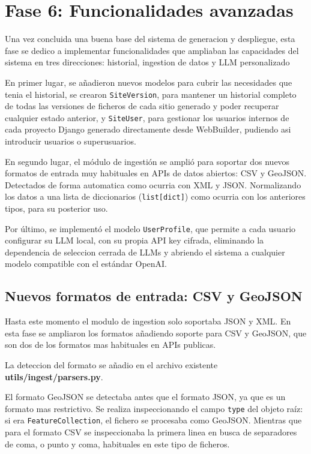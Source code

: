 \section{Fase 6: Funcionalidades avanzadas}
\label{sec:funcionalidades-avanzadas}

Una vez concluida una buena base del sistema de generacion y despliegue, esta fase se dedico a implementar funcionalidades que ampliaban las capacidades del sistema en tres direcciones: historial, ingestion de datos y LLM personalizado

En primer lugar, se añadieron nuevos modelos para cubrir las necesidades que tenia el historial, se crearon \texttt{SiteVersion}, para mantener 
un historial completo de todas las versiones de ficheros de cada sitio generado y poder recuperar cualquier estado anterior, y \texttt{SiteUser}, 
para gestionar los usuarios internos de cada proyecto Django generado directamente desde WebBuilder, pudiendo asi introducir usuarios o superusuarios.

En segundo lugar, el módulo de ingestión se amplió para soportar dos nuevos formatos de entrada muy habituales en APIs de datos abiertos: CSV y GeoJSON. Detectados de forma automatica como ocurria con XML y JSON. Normalizando los datos a una lista de diccionarios (\texttt{list[dict]}) como ocurria con los anteriores tipos, para su posterior uso.


Por último, se implementó el modelo \texttt{UserProfile}, que permite a cada usuario configurar su LLM local, con su propia API key cifrada, eliminando la dependencia de seleccion cerrada de LLMs y abriendo el sistema a cualquier modelo compatible con el estándar OpenAI.

\subsection{Nuevos formatos de entrada: CSV y GeoJSON}
\label{subsec:nuevos-formatos-entrada}

Hasta este momento el modulo de ingestion solo soportaba JSON y XML. En esta fase se ampliaron los formatos añadiendo soporte para CSV y GeoJSON, que son dos de los formatos mas habituales en APIs publicas.

La deteccion del formato se añadio en el archivo existente \textbf{utils/ingest/parsers.py}. 

El formato GeoJSON se detectaba antes que el formato JSON, ya que es un formato mas restrictivo. Se realiza inspeccionando el campo \texttt{type} del objeto raíz: si era \texttt{FeatureCollection}, el fichero se procesaba como GeoJSON. Mientras que para el formato CSV se inspeccionaba la primera linea en busca de separadores de coma, o punto y coma, habituales en este tipo de ficheros.

